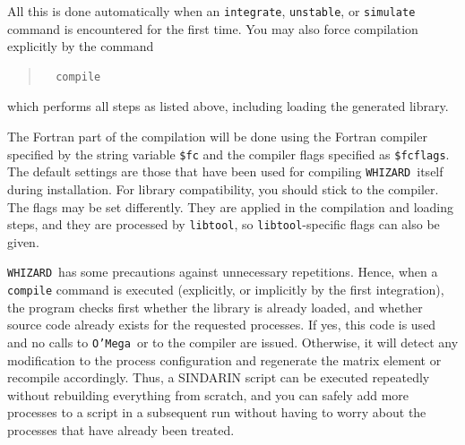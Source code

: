 \documentclass[12pt]{book}
\newcommand{\ttt}[1]{\texttt{#1}}
\newcommand{\whizard}{\texttt{WHIZARD}}
\newcommand{\oMega}{\texttt{O'Mega}}
\begin{document}
All this is done automatically when an \ttt{integrate}, \ttt{unstable}, or
\ttt{simulate} command is encountered for the first time.  You may also force
compilation explicitly by the command
\begin{quote}
\begin{footnotesize}
\begin{verbatim}
  compile  
\end{verbatim}
\end{footnotesize}
\end{quote}
which performs all steps as listed above, including loading the generated
library.

The Fortran part of the compilation will be done using the Fortran compiler
specified by the string variable
\verb|$fc| and the compiler flags specified as \verb|$fcflags|.  The default
settings are those that have been used for compiling \whizard\ itself during
installation.  For library compatibility, you should stick to the compiler.
The flags may be set differently.  They are applied in the compilation and
loading steps, and they are processed by \ttt{libtool}, so
\ttt{libtool}-specific flags can also be given.

\whizard\ has some precautions against unnecessary repetitions.  Hence, when a
\ttt{compile} command is executed (explicitly, or implicitly by the first
integration), the program checks first whether the library is already loaded,
and whether source code already exists for the requested processes.  If yes,
this code is used and no calls to \oMega\ or to the compiler are issued.
Otherwise, it will detect any modification to the process configuration and
regenerate the matrix element or recompile accordingly.  Thus, a SINDARIN
script can be executed repeatedly without rebuilding everything from scratch,
and you can safely add more processes to a script in a subsequent run without
having to worry about the processes that have already been treated.
\end{document}
